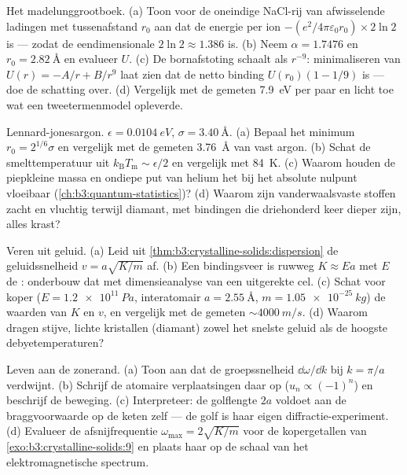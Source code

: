 \begin{exercise}[$\star\star$]\label{exo:b3:crystalline-solids:7}
Het madelunggrootboek. (a) Toon voor de oneindige NaCl-rij van afwisselende
ladingen met tussenafstand $r_0$ aan dat de energie per ion
$-(e^2/4\pi\varepsilon_0r_0)\times2\ln2$ is --- zodat de
eendimensionale  $2\ln2 \approx 1.386$ is. (b)
Neem $\alpha = 1.7476$ en $r_0 = \qty{2.82}{\angstrom}$ en evalueer $U$.
(c) De bornafstoting schaalt als $r^{-9}$: minimaliseren van
$U(r) = -A/r + B/r^9$ laat zien dat de netto binding $U(r_0)(1 - 1/9)$ is
--- doe de schatting over. (d) Vergelijk met de gemeten
\qty{7.9}{eV} per paar en licht toe wat een tweetermenmodel opleverde.
\end{exercise}

\begin{exercise}[$\star\star$]\label{exo:b3:crystalline-solids:8}
Lennard-jonesargon. $\epsilon = \qty{0.0104}{eV}$, $\sigma =
\qty{3.40}{\angstrom}$. (a) Bepaal het minimum $r_0 = 2^{1/6}
\sigma$ en vergelijk met de gemeten \qty{3.76}{\angstrom} van
vast argon. (b) Schat de smelttemperatuur uit
$k_{\text{B}}T_{\text{m}} \sim \epsilon/2$ en vergelijk met
\qty{84}{K}. (c) Waarom houden de piepkleine massa en ondiepe put van helium
het bij het absolute nulpunt vloeibaar (\cref{ch:b3:quantum-statistics})? (d)
Waarom zijn vanderwaalsvaste stoffen zacht en vluchtig terwijl diamant,
met bindingen die driehonderd keer dieper zijn, alles krast?
\end{exercise}

\begin{exercise}[$\star\star$]\label{exo:b3:crystalline-solids:9}
Veren uit geluid. (a) Leid uit
\cref{thm:b3:crystalline-solids:dispersion} de geluidssnelheid
$v = a\sqrt{K/m}$ af. (b) Een bindingsveer is ruwweg $K \approx
Ea$ met $E$ de : onderbouw dat met dimensieanalyse van
een uitgerekte cel. (c) Schat voor koper ($E = \qty{1.2e11}{Pa}$,
interatomair $a = \qty{2.55}{\angstrom}$, $m =
\qty{1.05e-25}{kg}$) de waarden van $K$ en $v$, en vergelijk met de
gemeten $\sim\qty{4000}{m/s}$. (d) Waarom dragen stijve, lichte kristallen
(diamant) zowel het snelste geluid als de hoogste debyetemperaturen?
\end{exercise}

\begin{exercise}[$\star\star\star$]\label{exo:b3:crystalline-solids:10}
Leven aan de zonerand. (a) Toon aan dat de groepssnelheid
$\dd\omega/\dd k$ bij $k = \pi/a$ verdwijnt. (b) Schrijf de atomaire
verplaatsingen daar op ($u_n \propto (-1)^n$) en beschrijf de
beweging. (c) Interpreteer: de golflengte $2a$ voldoet aan de
braggvoorwaarde op de keten zelf --- de golf is haar eigen diffractie-experiment.
(d) Evalueer de afsnijfrequentie
$\omega_{\text{max}} = 2\sqrt{K/m}$ voor de kopergetallen van
\cref{exo:b3:crystalline-solids:9} en plaats haar op de schaal van het
elektromagnetische spectrum.
\end{exercise}

